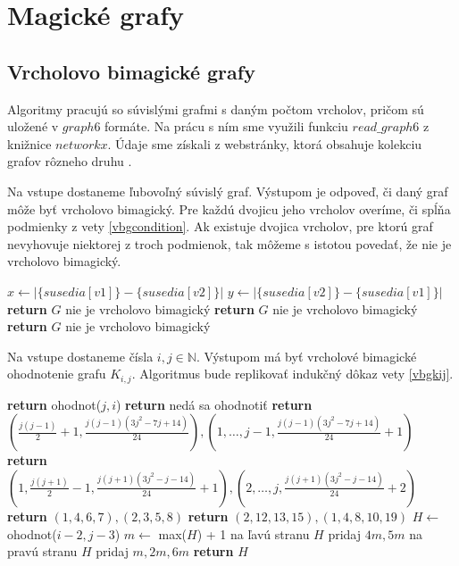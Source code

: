 \section{Magické grafy}

\subsection{Vrcholovo bimagické grafy}

Algoritmy pracujú so súvislými grafmi s daným počtom vrcholov, pričom sú uložené v $graph6$ formáte. Na prácu s ním sme využili funkciu $read \_ graph6$ z knižnice $networkx$. Údaje sme získali z webstránky, ktorá obsahuje kolekciu grafov rôzneho druhu \cite{graphlist}. \\
 
\begin{alg}
\label{algvbgcondition}
Na vstupe dostaneme ľubovoľný súvislý graf. Výstupom je odpoveď, či daný graf môže byť vrcholovo bimagický. Pre každú dvojicu jeho vrcholov overíme, či spĺňa podmienky z vety \ref{vbgcondition}. Ak existuje dvojica vrcholov, pre ktorú graf nevyhovuje niektorej z troch podmienok, tak môžeme s istotou povedať, že nie je vrcholovo bimagický.
\end{alg}

\begin{algorithmic}
    \STATE $x \gets |\{susedia[v1]\} - \{susedia[v2]\}|$
    \STATE $y \gets |\{susedia[v2]\} - \{susedia[v1]\}|$
	\STATE \textbf{return} $G$ nie je vrcholovo bimagický
    \ENDIF
	\STATE \textbf{return} $G$ nie je vrcholovo bimagický
    \ENDIF
	\STATE \textbf{return} $G$ nie je vrcholovo bimagický
    \ENDIF
\ENDFOR
\end{algorithmic}


\begin{alg}
\label{algvbgkij}
Na vstupe dostaneme čísla $i,j \in \mathbb{N}$. Výstupom má byť vrcholové bimagické ohodnotenie grafu $K_{i,j}$. Algoritmus bude replikovať indukčný dôkaz vety \ref{vbgkij}.
\end{alg}

\begin{algorithmic}
	\STATE \textbf{return} ohodnot($j,i$)
\ENDIF
{}
	\STATE \textbf{return} nedá sa ohodnotiť
\ENDIF
{}
	\STATE \textbf{return} $(\frac{j(j-1)}{2} + 1, \frac{j(j-1)(3j^2-7j+14)}{24}), (1, \dots , j-1, \frac{j(j-1)(3j^2-7j+14)}{24} + 1)$
\ENDIF
{}
	\STATE \textbf{return} $(1, \frac{j(j+1)}{2} - 1, \frac{j(j+1)(3j^2-j-14)}{24} + 1), (2, \dots , j, \frac{j(j+1)(3j^2-j-14)}{24} + 2)$
\ENDIF
{}
	\STATE \textbf{return} $(1, 4, 6, 7), (2, 3, 5, 8)$
\ENDIF
{}
	\STATE \textbf{return} $(2, 12, 13, 15), (1, 4, 8, 10, 19)$
\ENDIF
\STATE $H \gets$ ohodnot($i - 2, j - 3$)
\STATE $m \gets$ max($H$) + 1
\STATE na ľavú stranu $H$ pridaj $4m, 5m$
\STATE na pravú stranu $H$ pridaj $m, 2m, 6m$
\STATE \textbf{return} $H$
\end{algorithmic}

